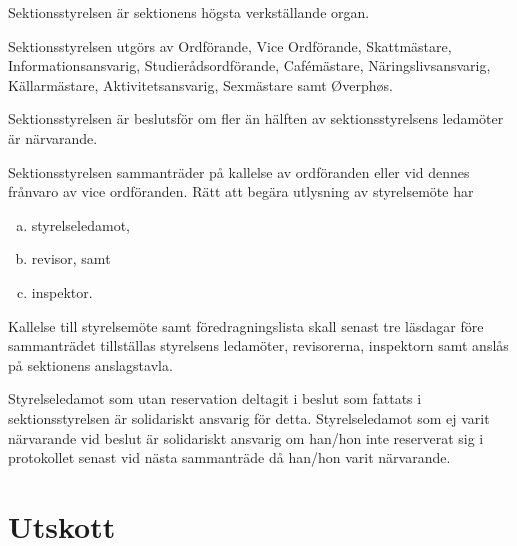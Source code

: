 \documentclass[stadgar]{dsekprotokoll}
\begin{document}
\begin{stadgeavsnitt}


Sektionsstyrelsen är sektionens högsta verkställande organ.


Sektionsstyrelsen utgörs av Ordförande, Vice Ordförande, Skattmästare, Informationsansvarig, Studierådsordförande, Cafémästare, Näringslivsansvarig, Källarmästare, Aktivitetsansvarig, Sexmästare samt Øverphøs.


Sektionsstyrelsen är beslutsför om fler än hälften av sektionsstyrelsens
ledamöter är närvarande.


Sektionsstyrelsen sammanträder på kallelse av ordföranden eller vid dennes
frånvaro av vice ordföranden. Rätt att begära utlysning av styrelsemöte
har
\begin{enumerate}[a)]
\item styrelseledamot,
\item revisor, samt
\item inspektor.
\end{enumerate}


Kallelse till styrelsemöte samt föredragningslista skall senast tre läsdagar före sammanträdet tillställas styrelsens ledamöter,
revisorerna, inspektorn samt anslås på sektionens anslagstavla.


Styrelseledamot som utan reservation deltagit i beslut som fattats i
sektionsstyrelsen är solidariskt ansvarig för detta. Styrelseledamot som ej
varit närvarande vid beslut är solidariskt ansvarig om han/hon inte
reserverat sig i protokollet senast vid nästa sammanträde då han/hon varit
närvarande.

\end{stadgeavsnitt}

\section{Utskott}
\end{document}

